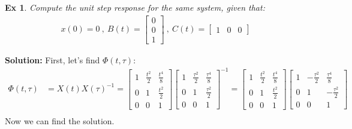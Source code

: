 \documentclass[twoside]{article}
\newtheorem{exmp}[theorem]{Ex}
\begin{document}
\begin{exmp}
Compute the unit step response for the same system, given that:
\begin{align*}
	x(0) = 0 \ , \ B(t) = \begin{bmatrix} 0 \\ 0 \\ 1 \end{bmatrix} 
	\ , \
	C(t) = \begin{bmatrix} 1 & 0 & 0 \end{bmatrix} 
\end{align*}
\end{exmp}
%
\textbf{Solution:} First, let's find $\Phi(t , \tau)$:
%
\begin{align*}
	\Phi(t , \tau) &= X(t) X(\tau)^{-1} = \begin{bmatrix} 1 & \frac{t^2}{2} & \frac{t^4}{8} \\ 0 & 1 & \frac{t^2}{2} \\ 0 & 0 & 1 \end{bmatrix} 
	\begin{bmatrix} 1 & \frac{\tau^2}{2} & \frac{\tau^4}{8} \\ 0 & 1 & \frac{\tau^2}{2} \\ 0 & 0 & 1 \end{bmatrix}^{-1}
	= \begin{bmatrix} 1 & \frac{t^2}{2} & \frac{t^4}{8} \\ 0 & 1 & \frac{t^2}{2} \\ 0 & 0 & 1 \end{bmatrix} 
	\begin{bmatrix} 1 & -\frac{\tau^2}{2} & \frac{\tau^4}{8}  \\ 0 & 1 & -\frac{\tau^2}{2} \\ 0 & 0 & 1 \end{bmatrix}
	\\
\end{align*}
%
Now we can find the solution.
%
\end{document}
